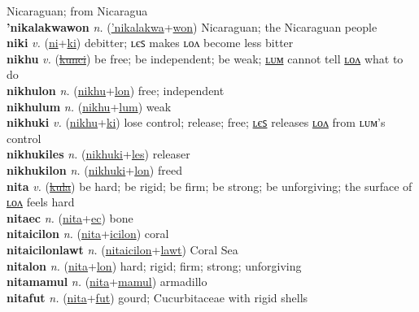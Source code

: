 Nicaraguan; from Nicaragua \label{'nikalakwaak} \\
\textbf{'nikalakwawon} \textit{n.} (\hyperref['nikalakwa]{'nikalakwa}+\hyperref[won]{won})
Nicaraguan; the Nicaraguan people \label{'nikalakwawon} \\
\textbf{niki} \textit{v.} (\hyperref[ni]{ni}+\hyperref[ki]{ki})
debitter; ʟєꜱ makes ʟᴏᴧ become less bitter \label{niki} \\
\textbf{nikhu} \textit{v.} (\hyperref[kunci]{\sout{kunci}})
be free; be independent; be weak; \hyperref[nikhulum]{ʟᴜᴍ} cannot tell \hyperref[nikhulon]{ʟᴏᴧ} what to do \label{nikhu} \\
\textbf{nikhulon} \textit{n.} (\hyperref[nikhu]{nikhu}+\hyperref[lon]{lon})
free; independent \label{nikhulon} \\
\textbf{nikhulum} \textit{n.} (\hyperref[nikhu]{nikhu}+\hyperref[lum]{lum})
weak \label{nikhulum} \\
\textbf{nikhuki} \textit{v.} (\hyperref[nikhu]{nikhu}+\hyperref[ki]{ki})
lose control; release; free; \hyperref[nikhukiles]{ʟєꜱ} releases \hyperref[nikhukilon]{ʟᴏᴧ} from ʟᴜᴍ’s control \label{nikhuki} \\
\textbf{nikhukiles} \textit{n.} (\hyperref[nikhuki]{nikhuki}+\hyperref[les]{les})
releaser \label{nikhukiles} \\
\textbf{nikhukilon} \textit{n.} (\hyperref[nikhuki]{nikhuki}+\hyperref[lon]{lon})
freed \label{nikhukilon} \\
\textbf{nita} \textit{v.} (\hyperref[kula]{\sout{kula}})
be hard; be rigid; be firm; be strong; be unforgiving; the surface of \hyperref[nitalon]{ʟᴏᴧ} feels hard \label{nita} \\
\textbf{nitaec} \textit{n.} (\hyperref[nita]{nita}+\hyperref[ec]{ec})
bone \label{nitaec} \\
\textbf{nitaicilon} \textit{n.} (\hyperref[nita]{nita}+\hyperref[icilon]{icilon})
coral \label{nitaicilon} \\
\textbf{nitaicilonlawt} \textit{n.} (\hyperref[nitaicilon]{nitaicilon}+\hyperref[lawt]{lawt})
Coral Sea \label{nitaicilonlawt} \\
\textbf{nitalon} \textit{n.} (\hyperref[nita]{nita}+\hyperref[lon]{lon})
hard; rigid; firm; strong; unforgiving \label{nitalon} \\
\textbf{nitamamul} \textit{n.} (\hyperref[nita]{nita}+\hyperref[mamul]{mamul})
armadillo \label{nitamamul} \\
\textbf{nitafut} \textit{n.} (\hyperref[nita]{nita}+\hyperref[fut]{fut})
gourd; Cucurbitaceae with rigid shells \label{nitafut} \\
